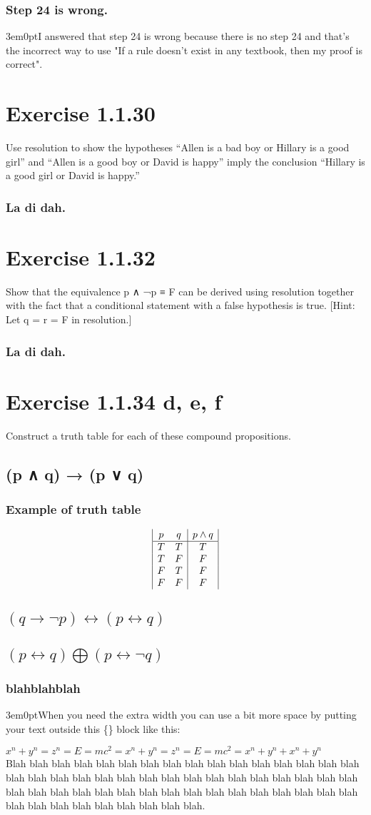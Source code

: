 \documentclass[letter]{article}
\newcommand{\problemnumber}[1] {\filbreak\section{#1}}
\newcommand{\question}[1] {\subsection{#1}}
\newcommand{\answer}[1] {\subsubsection{#1}}
\newcommand{\explanation}[1] {\begin{adjustwidth}{3em}{0pt}#1\end{adjustwidth}}
\begin{document}
\answer{Step 24 is wrong.}
\explanation{I answered that step 24 is wrong because there is no step 24 and that's the incorrect way to use "If a rule doesn't exist in any textbook, then my proof is correct".}
 
 
 
\problemnumber{Exercise 1.1.30}{Use resolution to show the hypotheses “Allen is a bad
boy or Hillary is a good girl” and “Allen is a good boy or
David is happy” imply the conclusion “Hillary is a good
girl or David is happy.”}
\answer{La di dah.}


\problemnumber{Exercise 1.1.32}{Show that the equivalence p ∧ ¬p ≡ F can be derived using
resolution together with the fact that a conditional
statement with a false hypothesis is true. [Hint: Let q =
r = F in resolution.]}
\answer{La di dah.}

\problemnumber{Exercise 1.1.34 d, e, f}
Construct a truth table for each of these compound propositions.
\setcounter{subsection}{2} %
\question{(p ∧ q) → (p ∨ q)}
\answer{Example of truth table}
\begin{displaymath}
\begin{array}{|c c|c|}
p & q & p \land q\\ %
\hline %
T & T & T\\
T & F & F\\
F & T & F\\
F & F & F\\
\end{array}
\end{displaymath}
\question{$(q \rightarrow \neg p) \leftrightarrow (p \leftrightarrow q)$}
\question{$(p \leftrightarrow q) \bigoplus (p \leftrightarrow \neg q)$}
\answer{blahblahblah}


\explanation{When you need the extra width you can use a bit more space by putting your text outside this \{\} block like this:}
$x^n + y^n = z^n = E=mc^2 = x^n + y^n = z^n = E=mc^2 = x^n + y^n + x^n + y^n$\\
Blah blah blah blah blah blah blah blah blah blah blah blah blah blah blah blah blah blah blah blah blah blah blah blah blah blah blah blah blah blah blah blah blah blah blah blah blah blah blah blah blah blah blah blah blah blah blah blah blah blah blah blah blah blah blah blah blah.
\end{document}

